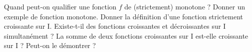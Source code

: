 %
%
	\begin{tasks}
		\task Quand peut-on qualifier une fonction $f$ de (strictement) monotone ?
		\task Donner un exemple de fonction monotone.
		\task Donner la définition d'une fonction strictement croissante sur I.
		\task Existe-t-il des fonctions croissantes et décroissantes sur I simultanément ?
		\task La somme de deux fonctions croissantes sur I est-elle croissante sur I ? Peut-on le démontrer ?
	\end{tasks}
